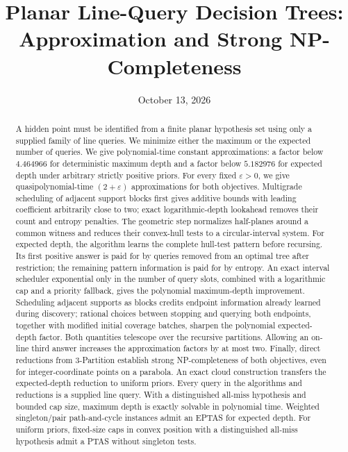 \documentclass[11pt]{article}
\title{Planar Line-Query Decision Trees:\\
Approximation and Strong NP-Completeness}
\author{}
\date{October 13, 2026}
\theoremstyle{definition}
\theoremstyle{remark}
\begin{document}
\maketitle

\begin{abstract}
A hidden point must be identified from a finite planar hypothesis set
using only a supplied family of line queries. We minimize either the
maximum or the expected number of queries. We give polynomial-time
constant approximations: a factor below $4.464966$ for
deterministic maximum depth and a factor below $5.182976$ for expected depth
under arbitrary strictly positive priors. For every fixed
$\varepsilon>0$, we give quasipolynomial-time $(2+\varepsilon)$
approximations for both objectives. Multigrade scheduling of adjacent
support blocks first gives additive bounds with leading coefficient
arbitrarily close to two; exact logarithmic-depth lookahead removes
their count and entropy penalties. The geometric step normalizes half-planes
around a common witness and reduces their convex-hull tests to a
circular-interval system. For expected depth, the algorithm learns
the complete hull-test pattern before recursing. Its first positive
answer is paid for by queries removed from an optimal tree after
restriction; the remaining pattern information is paid for by entropy.
An exact interval scheduler exponential only in the number of query
slots, combined with a logarithmic cap and a priority fallback, gives
the polynomial maximum-depth improvement. Scheduling adjacent supports
as blocks credits endpoint information already learned during discovery;
rational choices between stopping and querying both endpoints, together
with modified initial coverage batches, sharpen the polynomial expected-depth factor.
Both quantities telescope over the recursive partitions. Allowing
an on-line third answer increases the approximation factors by at
most two. Finally, direct reductions from 3-Partition establish
strong NP-completeness of both objectives, even for integer-coordinate
points on a parabola. An exact cloud construction transfers the
expected-depth reduction to uniform priors. Every query in
the algorithms and reductions is a supplied line query.
With a distinguished all-miss hypothesis and bounded cap size,
maximum depth is exactly solvable in polynomial time. Weighted
singleton/pair path-and-cycle instances admit an EPTAS for expected depth.
For uniform priors, fixed-size caps in convex position with a
distinguished all-miss hypothesis admit a PTAS without singleton tests.
\end{abstract}
\end{document}
